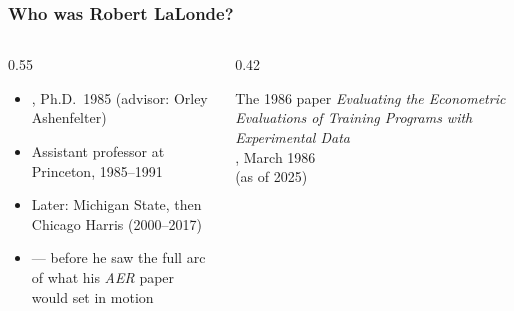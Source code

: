 \documentclass[10pt,aspectratio=169]{beamer}
\begin{document}
\begin{frame}
  \frametitle{Who was Robert LaLonde?}
  \vspace{0.2cm}
  \begin{columns}[T,onlytextwidth]
    \begin{column}{0.55\textwidth}
      \begin{itemize}
        \item {}, Ph.D.\ 1985 (advisor: Orley Ashenfelter)
        \item Assistant professor at Princeton, 1985--1991
        \item Later: Michigan State, then Chicago Harris (2000--2017)
        \item {} --- before he saw the full
        arc of what his \emph{AER} paper would set in motion
      \end{itemize}
      \vspace{0.5em}
    \end{column}
    \begin{column}{0.42\textwidth}
      \begin{block}{The 1986 paper}
        \textit{Evaluating the Econometric Evaluations of Training Programs
        with Experimental Data}\\[0.3em]
        , March 1986\\[0.3em]
         (as of 2025)
      \end{block}
    \end{column}
  \end{columns}
\end{frame}


\end{document}
